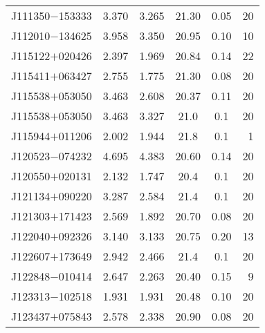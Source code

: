 \begin{table}
\begin{center}
{\begin{tabular}{lccccr}
 J111350$-$153333 &      3.370 &                    3.265 &                   21.30 &               0.05 &                20 \\
 J112010$-$134625 &      3.958 &                    3.350 &                   20.95 &               0.10 &                10 \\
 J115122$+$020426 &      2.397 &                    1.969 &                   20.84 &               0.14 &                22 \\
 J115411$+$063427 &      2.755 &                    1.775 &                   21.30 &               0.08 &                20 \\
 J115538$+$053050 &      3.463 &                    2.608 &                   20.37 &               0.11 &                20 \\
 J115538$+$053050 &      3.463 &                    3.327 &                   21.0  &               0.1  &                20 \\
 J115944$+$011206 &      2.002 &                    1.944 &                    21.8 &                0.1 &                 1 \\
 J120523$-$074232 &      4.695 &                    4.383 &                   20.60 &               0.14 &                20 \\
 J120550$+$020131 &      2.132 &                    1.747 &                    20.4 &                0.1 &                20 \\
 J121134$+$090220 &      3.287 &                    2.584 &                    21.4 &                0.1 &                20 \\
 J121303$+$171423 &      2.569 &                    1.892 &                   20.70 &               0.08 &                20 \\
 J122040$+$092326 &      3.140 &                    3.133 &                   20.75 &               0.20 &                13 \\
 J122607$+$173649 &      2.942 &                    2.466 &                    21.4 &                0.1 &                20 \\
 J122848$-$010414 &      2.647 &                    2.263 &                   20.40 &               0.15 &                 9 \\
 J123313$-$102518 &      1.931 &                    1.931 &                   20.48 &               0.10 &                20 \\
 J123437$+$075843 &      2.578 &                    2.338 &                   20.90 &               0.08 &                20 \\

\end{tabular}}
\end{center}
\end{table}
